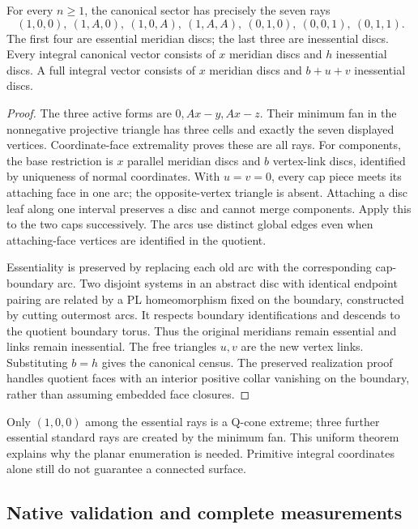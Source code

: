 \begin{proposition}
For every $n\ge1$, the canonical sector has precisely the seven rays
\[
 (1,0,0),\ (1,A,0),\ (1,0,A),\ (1,A,A),\
 (0,1,0),\ (0,0,1),\ (0,1,1).
\]
The first four are essential meridian discs; the last three are inessential
discs. Every integral canonical vector consists of $x$ meridian discs
and $h$ inessential discs. A full integral vector consists of $x$ meridian
discs and $b+u+v$ inessential discs.
\end{proposition}
\begin{proof}
The three active forms are $0,Ax-y,Ax-z$. Their minimum fan in the
nonnegative projective triangle has three cells and exactly the seven
displayed vertices. Coordinate-face extremality proves these are all rays.
For components, the base restriction is $x$ parallel meridian discs and
$b$ vertex-link discs, identified by uniqueness of normal coordinates.
With $u=v=0$, every cap piece meets its attaching face in one arc; the
opposite-vertex triangle is absent. Attaching a disc leaf along one interval
preserves a disc and cannot merge components. Apply this to the two caps
successively. The arcs use distinct global edges even when attaching-face
vertices are identified in the quotient.

Essentiality is preserved by replacing each old arc with the corresponding
cap-boundary arc. Two disjoint systems in an abstract disc with identical
endpoint pairing are related by a PL homeomorphism fixed on the boundary,
constructed by cutting outermost arcs. It respects boundary identifications
and descends to the quotient boundary torus. Thus the original meridians
remain essential and links remain inessential. The free triangles $u,v$
are the new vertex links. Substituting $b=h$ gives the canonical census.
The preserved realization proof handles quotient faces with an interior
positive collar vanishing on the boundary, rather than assuming embedded
face closures.
\end{proof}

Only $(1,0,0)$ among the essential rays is a Q-cone extreme; three further
essential standard rays are created by the minimum fan. This uniform
theorem explains why the planar enumeration is needed. Primitive integral
coordinates alone still do not guarantee a connected surface.

\subsection{Native validation and complete measurements}

